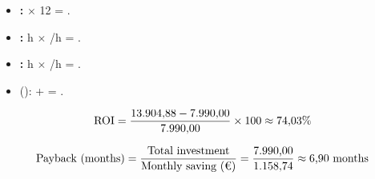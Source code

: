 \exROIIntro

\begin{itemize}
    \item \textbf{\exROIHoursYear:}  \exHPerMonth{} $\times$ 12 \exMonths{} =  \exHPerYear.
    \item \textbf{\exROIMoneyYear:}  h $\times$ /h = .
    \item \textbf{\exROIMoneyMonth:}  h $\times$ /h = .
    \item \textbf{\exROIInvestment} (\exROIInvestmentNote):  +  = .
\end{itemize}

\begin{equation}
\text{ROI} = \frac{\text{\numfmt{13.904,88}{13,904.88}} - \text{\numfmt{7.990,00}{7,990.00}}}{\text{\numfmt{7.990,00}{7,990.00}}} \times 100 \approx \text{\pct{\numfmt{74,03}{74.03}}}
\end{equation}

\begin{equation}
\text{\exPaybackLabel} = \frac{\text{\exTotalInvestment}}{\text{\exMonthlySaving}} = \frac{\text{\numfmt{7.990,00}{7,990.00}}}{\text{\numfmt{1.158,74}{1,158.74}}} \approx \text{\numfmt{6,90}{6.90} \exMonths}
\end{equation}

\exROIConclusion
